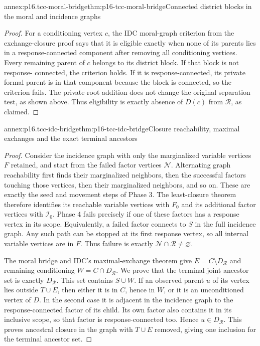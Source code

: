 \begin{annexitem}{annex:p16.tcc-moral-bridge}{thm:p16-tcc-moral-bridge}{Connected district blocks in the moral and incidence graphs}
\begin{proof}
For a conditioning vertex \(c\), the IDC moral-graph criterion
from the exchange-closure proof says that it is eligible exactly
when none of its parents lies in a response-connected component
after removing all conditioning vertices. Every remaining parent of \(c\)
belongs to its district block. If that block is not response-
connected, the criterion holds. If it is response-connected, its
private formal parent is in that component because the block
is connected, so the criterion fails. The private-root addition
does not change the original separation test, as shown above.
Thus eligibility is exactly absence of \(D(c)\) from
\(\mathcal R\), as claimed.
\end{proof}
\end{annexitem}

\begin{annexitem}{annex:p16.tcc-idc-bridge}{thm:p16-tcc-idc-bridge}{Closure reachability, maximal exchanges and the exact terminal ancestors}
\begin{proof}
Consider the incidence graph with only the marginalized variable
vertices \(F\) retained, and start from the failed factor
vertices \(\mathcal N\). Alternating graph reachability first
finds their marginalized neighbors, then the successful factors
touching those vertices, then their marginalized neighbors, and
so on. These are exactly the seed and movement steps of Phase 3.
The least-closure theorem therefore identifies its reachable
variable vertices with \(F_0\) and its additional factor
vertices with \(\mathcal I_0\). Phase 4 fails precisely if
one of these factors has a response vertex in its scope.
Equivalently, a failed factor connects to \(S\) in the full
incidence graph. Any such path can be stopped at its first
response vertex, so all internal variable vertices are in \(F\).
Thus failure is exactly \(\mathcal N\cap\mathcal R\ne\varnothing\).

The moral bridge and IDC's maximal-exchange theorem give
\(E=C\setminus D_{\mathcal R}\) and remaining conditioning
\(W=C\cap D_{\mathcal R}\). We prove that the terminal
joint ancestor set is exactly \(D_{\mathcal R}\).
This set contains \(S\cup W\). If an observed parent \(u\)
of its vertex lies outside \(T\cup E\), then either it is
in \(C\), hence in \(W\), or it is an unconditioned
vertex of \(D\). In the second case it is adjacent in the
incidence graph to the response-connected factor of its child.
Its own factor also contains it in its inclusive scope, so that
factor is response-connected too. Hence \(u\in D_{\mathcal R}\).
This proves ancestral closure in the graph with \(T\cup E\)
removed, giving one inclusion for the terminal ancestor set.


\end{proof}
\end{annexitem}
